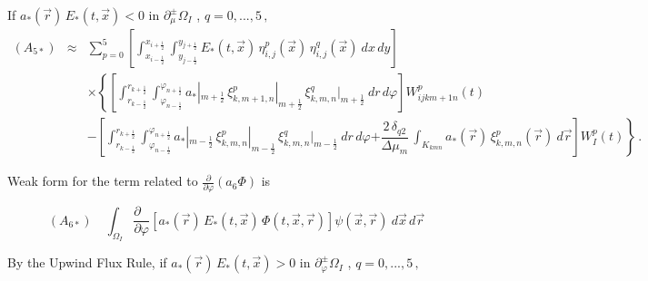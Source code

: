\documentclass[11pt]{article}
\newcommand{\ot}{\frac{1}{2}}
\begin{document}
If $a_{*}(\vec{r}) \, E_{*}(t,\vec{x}) < 0$ in $\partial_{\mu}^{\pm}  \Omega_{I}$ , 
$q = 0, ...,5 \, ,$
%
{\small
\begin{eqnarray*}
(A_{5*})
&
\approx
&
\sum_{p=0}^{5} 
\left[ 
\int_{x_{i - \ot}}^{x_{i + \ot}} 
\int_{y_{j - \ot}}^{y_{j + \ot}} 
E_{*}(t,\vec{x}) \, \eta^{p}_{i,j}(\vec{x}) \, \eta^{q}_{i,j}(\vec{x}) \:dx \, dy 
\right] 
\\
& & %
\times
\left\lbrace 
\left[ %
\int_{r_{k - \ot}}^{r_{k + \ot}}
\int_{\varphi_{n - \ot}}^{\varphi_{n + \ot}} 
a_{*}|_{m + \ot} \, \xi^{p}_{k,m+1,n}|_{m + \ot} \, 
\xi^{q}_{k,m,n}|_{m + \ot} \: dr \, d\varphi %
\right]
W_{ijkm+1 n}^p(t)
\right.
\\
& & %
- \left[ %
\int_{r_{k - \ot}}^{r_{k + \ot}} 
\int_{\varphi_{n - \ot}}^{\varphi_{n + \ot}} 
a_{*}|_{m - \ot} \, \xi^{p}_{k,m,n}|_{m - \ot} \, 
\xi^{q}_{k,m,n}|_{m - \ot} \: dr \, d\varphi %
\right. 
\left. \left. %
+ \dfrac{2 \, \delta_{q2}}{\Delta \mu_{m}} \,  \int_{K_{kmn}}
a_{*}(\vec{r}) \,  \xi^{p}_{k,m,n}(\vec{r}) \: d\vec{r}  %
\right] 
W_{I}^p (t)
\right\rbrace \, .
\end{eqnarray*}
}%
%

Weak form for the term related to $\frac{\partial}{\partial \varphi} \left( a_6 \Phi \right) $ is

\begin{equation}
(A_{6*}) \quad
\int_{\Omega_{I}}
\frac{\partial \mbox{ }}{\partial \varphi} 
\left[ a_{*}(\vec{r}) \, E_{*}(t,\vec{x}) \, \Phi(t,\vec{x},\vec{r}) \right] 
\psi(\vec{x},\vec{r}) \: d\vec{x} \, d\vec{r}  
\end{equation} 


By the Upwind Flux Rule, if $a_{*}(\vec{r}) \, E_{*}(t,\vec{x}) > 0$ in $\partial_{\varphi}^{\pm} \Omega_{I}$ 
, $q = 0, ...,5 \, ,$
\end{document}
